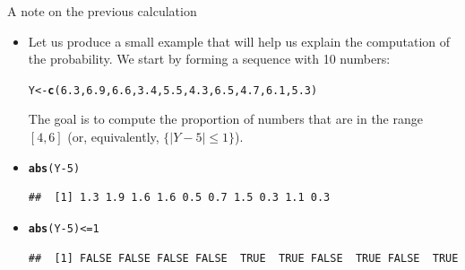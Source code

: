 \documentclass[10pt]{beamer}\usepackage[]{graphicx}\usepackage[]{color}
\makeatletter
\newcommand{\hlnum}[1]{\textcolor[rgb]{0.686,0.059,0.569}{#1}}%
\newcommand{\hlopt}[1]{\textcolor[rgb]{0,0,0}{#1}}%
\newcommand{\hlstd}[1]{\textcolor[rgb]{0.345,0.345,0.345}{#1}}%
\newcommand{\hlkwb}[1]{\textcolor[rgb]{0.69,0.353,0.396}{#1}}%
\newcommand{\hlkwd}[1]{\textcolor[rgb]{0.737,0.353,0.396}{\textbf{#1}}}%
\newenvironment{kframe}{%
 \def\at@end@of@kframe{}%
 \ifinner\ifhmode%
  \def\at@end@of@kframe{\end{minipage}}%
  \begin{minipage}{\columnwidth}%
 \fi\fi%
 \def\FrameCommand##1{\hskip\@totalleftmargin \hskip-\fboxsep
 \colorbox{shadecolor}{##1}\hskip-\fboxsep
     \hskip-\linewidth \hskip-\@totalleftmargin \hskip\columnwidth}%
 \MakeFramed {\advance\hsize-\width
   \@totalleftmargin\z@ \linewidth\hsize
   \@setminipage}}%
 {\par\unskip\endMakeFramed%
 \at@end@of@kframe}
\newenvironment{knitrout}{}{} %
\makeatother
\begin{document}
\begin{frame}[fragile]{A note on the previous calculation}
	\small
	\begin{itemize}[<+->]
		
		\item Let us produce a small example that will help us explain the computation
		of the probability. We start by forming a sequence with 10 numbers:
				
\begin{knitrout}
\color{fgcolor}\begin{kframe}
\begin{alltt}
\hlstd{Y} \hlkwb{<-} \hlkwd{c}\hlstd{(}\hlnum{6.3}\hlstd{,} \hlnum{6.9}\hlstd{,} \hlnum{6.6}\hlstd{,} \hlnum{3.4}\hlstd{,} \hlnum{5.5}\hlstd{,} \hlnum{4.3}\hlstd{,} \hlnum{6.5}\hlstd{,} \hlnum{4.7}\hlstd{,} \hlnum{6.1}\hlstd{,} \hlnum{5.3}\hlstd{)}
\end{alltt}
\end{kframe}
\end{knitrout}
		
		The goal is to compute the proportion of numbers that are in the range
		$[4,6]$ (or, equivalently, $\{|Y-5| \leq 1\}$).
		
		\item 
		
\begin{knitrout}
\color{fgcolor}\begin{kframe}
\begin{alltt}
\hlkwd{abs}\hlstd{(Y}\hlopt{-}\hlnum{5}\hlstd{)}
\end{alltt}
\begin{verbatim}
##  [1] 1.3 1.9 1.6 1.6 0.5 0.7 1.5 0.3 1.1 0.3
\end{verbatim}
\end{kframe}
\end{knitrout}

\item 

\begin{knitrout}
\color{fgcolor}\begin{kframe}
\begin{alltt}
\hlkwd{abs}\hlstd{(Y} \hlopt{-} \hlnum{5}\hlstd{)} \hlopt{<=} \hlnum{1}
\end{alltt}
\begin{verbatim}
##  [1] FALSE FALSE FALSE FALSE  TRUE  TRUE FALSE  TRUE FALSE  TRUE
\end{verbatim}
\end{kframe}
\end{knitrout}



\end{itemize}
\end{frame}
\end{document}
